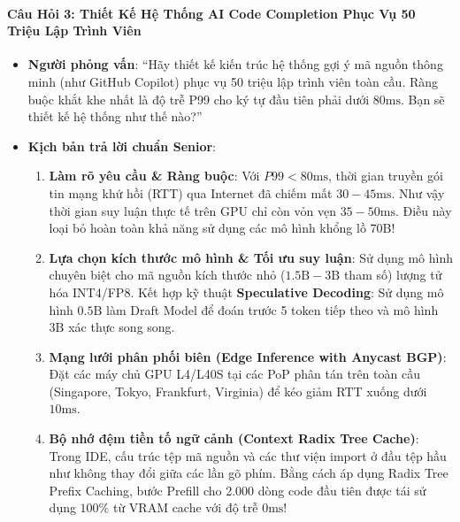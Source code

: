 \paragraph{Câu Hỏi 3: Thiết Kế Hệ Thống AI Code Completion Phục Vụ 50 Triệu Lập Trình Viên}
\begin{itemize}
  \item \textbf{Người phỏng vấn}: ``Hãy thiết kế kiến trúc hệ thống gợi ý mã nguồn thông minh (như GitHub Copilot) phục vụ 50 triệu lập trình viên toàn cầu. Ràng buộc khắt khe nhất là độ trễ P99 cho ký tự đầu tiên phải dưới $80\text{ms}$. Bạn sẽ thiết kế hệ thống như thế nào?''
  \item \textbf{Kịch bản trả lời chuẩn Senior}:
  \begin{enumerate}
    \item \textbf{Làm rõ yêu cầu \& Ràng buộc}: Với $P99 < 80\text{ms}$, thời gian truyền gói tin mạng khứ hồi (RTT) qua Internet đã chiếm mất $30 - 45\text{ms}$. Như vậy thời gian suy luận thực tế trên GPU chỉ còn vỏn vẹn $35 - 50\text{ms}$. Điều này loại bỏ hoàn toàn khả năng sử dụng các mô hình khổng lồ 70B!
    \item \textbf{Lựa chọn kích thước mô hình \& Tối ưu suy luận}:
    Sử dụng mô hình chuyên biệt cho mã nguồn kích thước nhỏ ($1.5\text{B} - 3\text{B}$ tham số) lượng tử hóa INT4/FP8. Kết hợp kỹ thuật \textbf{Speculative Decoding}: Sử dụng mô hình $0.5\text{B}$ làm Draft Model để đoán trước 5 token tiếp theo và mô hình $3\text{B}$ xác thực song song.
    \item \textbf{Mạng lưới phân phối biên (Edge Inference with Anycast BGP)}: Đặt các máy chủ GPU L4/L40S tại các PoP phân tán trên toàn cầu (Singapore, Tokyo, Frankfurt, Virginia) để kéo giảm RTT xuống dưới $10\text{ms}$.
    \item \textbf{Bộ nhớ đệm tiền tố ngữ cảnh (Context Radix Tree Cache)}: Trong IDE, cấu trúc tệp mã nguồn và các thư viện import ở đầu tệp hầu như không thay đổi giữa các lần gõ phím. Bằng cách áp dụng Radix Tree Prefix Caching, bước Prefill cho 2.000 dòng code đầu tiên được tái sử dụng $100\%$ từ VRAM cache với độ trễ $0\text{ms}$!
  \end{enumerate}
\end{itemize}

